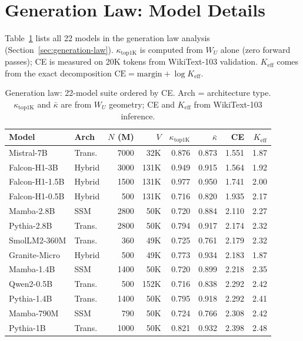 \documentclass{article}
\begin{document}
\section{Generation Law: Model Details}
\label{app:generation-law}

Table~\ref{tab:generation-law-models} lists all 22 models in the generation law analysis (Section~\ref{sec:generation-law}).
$\kappa_{\mathrm{top1K}}$ is computed from $W_U$ alone (zero forward passes); CE is measured on 20K tokens from WikiText-103 validation.
$K_{\mathrm{eff}}$ comes from the exact decomposition $\mathrm{CE}=\mathrm{margin}+\log K_{\mathrm{eff}}$.

\begin{table}[h]
\centering
\caption{Generation law: 22-model suite ordered by CE. Arch = architecture type.
$\kappa_{\mathrm{top1K}}$ and $\bar\kappa$ are from $W_U$ geometry; CE and $K_{\mathrm{eff}}$ from WikiText-103 inference.}
\label{tab:generation-law-models}
\small
\begin{tabular}{llrrrrrr}
\toprule
Model & Arch & $N$ (M) & $V$ & $\kappa_{\mathrm{top1K}}$ & $\bar\kappa$ & CE & $K_{\mathrm{eff}}$ \\
\midrule
Mistral-7B & Trans. & 7000 & 32K & 0.876 & 0.873 & 1.551 & 1.87 \\
Falcon-H1-3B & Hybrid & 3000 & 131K & 0.949 & 0.915 & 1.564 & 1.92 \\
Falcon-H1-1.5B & Hybrid & 1500 & 131K & 0.977 & 0.950 & 1.741 & 2.00 \\
Falcon-H1-0.5B & Hybrid & 500 & 131K & 0.716 & 0.820 & 1.935 & 2.17 \\
Mamba-2.8B & SSM & 2800 & 50K & 0.720 & 0.884 & 2.110 & 2.27 \\
Pythia-2.8B & Trans. & 2800 & 50K & 0.794 & 0.917 & 2.174 & 2.32 \\
SmolLM2-360M & Trans. & 360 & 49K & 0.725 & 0.761 & 2.179 & 2.32 \\
Granite-Micro & Hybrid & 500 & 49K & 0.773 & 0.934 & 2.183 & 1.87 \\
Mamba-1.4B & SSM & 1400 & 50K & 0.720 & 0.899 & 2.218 & 2.35 \\
Qwen2-0.5B & Trans. & 500 & 152K & 0.716 & 0.838 & 2.292 & 2.42 \\
Pythia-1.4B & Trans. & 1400 & 50K & 0.795 & 0.918 & 2.292 & 2.41 \\
Mamba-790M & SSM & 790 & 50K & 0.724 & 0.766 & 2.308 & 2.42 \\
Pythia-1B & Trans. & 1000 & 50K & 0.821 & 0.932 & 2.398 & 2.48 \\

\end{tabular}
\end{table}
\end{document}
